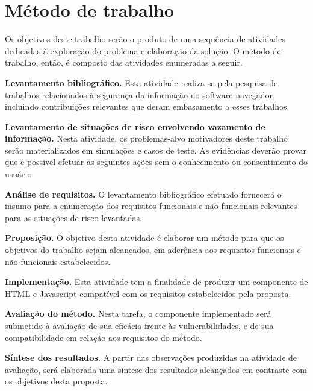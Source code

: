 \section{Método de trabalho}


Os objetivos deste trabalho serão o produto de uma sequência de atividades dedicadas à exploração do problema e elaboração da solução. O método de trabalho, então, é composto das atividades enumeradas a seguir.


\begin{alineas}
	\item \textbf{Levantamento bibliográfico.}
	Esta atividade realiza-se pela pesquisa de trabalhos relacionados à segurança da informação no software navegador, incluindo contribuições relevantes que deram embasamento a esses trabalhos.
	
	\item \textbf{Levantamento de situações de risco envolvendo vazamento de informação.}
	Nesta atividade, os problemas-alvo motivadores deste trabalho serão materializados em simulações e casos de teste. As evidências deverão provar que é possível efetuar as seguintes ações sem o conhecimento ou consentimento do usuário:
	
	\begin{alineas}
	\end{alineas}

	\item \textbf{Análise de requisitos.}
	O levantamento bibliográfico efetuado fornecerá o insumo para a enumeração dos requisitos funcionais e não-funcionais relevantes para as situações de risco levantadas.
	
	\item \textbf{Proposição.}
	O objetivo desta atividade é elaborar um método para que os objetivos do trabalho sejam alcançados, em aderência aos requisitos funcionais e não-funcionais estabelecidos.

	\item \textbf{Implementação.}
	Esta atividade tem a finalidade de produzir um componente de HTML e Javascript compatível com os requisitos estabelecidos pela proposta.
		
	\item\textbf{Avaliação do método.}
	Nesta tarefa, o componente implementado será submetido à avaliação de sua eficácia frente às vulnerabilidades, e de sua compatibilidade em relação aos requisitos do método.
	
	\item \textbf{Síntese dos resultados.}
	A partir das observações produzidas na atividade de avaliação, será elaborada uma síntese dos resultados alcançados em contraste com os objetivos desta proposta.
\end{alineas}

